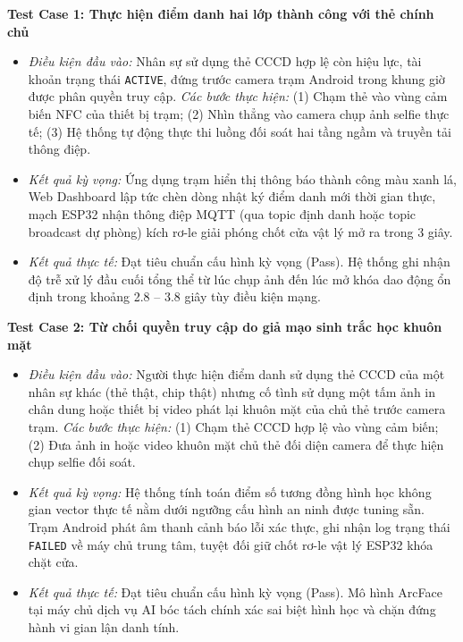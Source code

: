 \documentclass[../DoAn.tex]{subfiles}
\begin{document}
\textbf{Test Case 1: Thực hiện điểm danh hai lớp thành công với thẻ chính chủ}
\begin{itemize}
    \item \textit{Điều kiện đầu vào:} Nhân sự sử dụng thẻ CCCD hợp lệ còn hiệu lực, tài khoản trạng thái \texttt{ACTIVE}, đứng trước camera trạm Android trong khung giờ được phân quyền truy cập.
    \textit{Các bước thực hiện:} (1) Chạm thẻ vào vùng cảm biến NFC của thiết bị trạm; (2) Nhìn thẳng vào camera chụp ảnh selfie thực tế; (3) Hệ thống tự động thực thi luồng đối soát hai tầng ngầm và truyền tải thông điệp.
    \item \textit{Kết quả kỳ vọng:} Ứng dụng trạm hiển thị thông báo thành công màu xanh lá, Web Dashboard lập tức chèn dòng nhật ký điểm danh mới thời gian thực, mạch ESP32 nhận thông điệp MQTT (qua topic định danh hoặc topic broadcast dự phòng) kích rơ-le giải phóng chốt cửa vật lý mở ra trong 3 giây.
    \item \textit{Kết quả thực tế:} Đạt tiêu chuẩn cấu hình kỳ vọng (Pass). Hệ thống ghi nhận độ trễ xử lý đầu cuối tổng thể từ lúc chụp ảnh đến lúc mở khóa dao động ổn định trong khoảng 2.8 -- 3.8 giây tùy điều kiện mạng.
\end{itemize}

\textbf{Test Case 2: Từ chối quyền truy cập do giả mạo sinh trắc học khuôn mặt}
\begin{itemize}
    \item \textit{Điều kiện đầu vào:} Người thực hiện điểm danh sử dụng thẻ CCCD của một nhân sự khác (thẻ thật, chip thật) nhưng cố tình sử dụng một tấm ảnh in chân dung hoặc thiết bị video phát lại khuôn mặt của chủ thẻ trước camera trạm.
    \textit{Các bước thực hiện:} (1) Chạm thẻ CCCD hợp lệ vào vùng cảm biến; (2) Đưa ảnh in hoặc video khuôn mặt chủ thẻ đối diện camera để thực hiện chụp selfie đối soát.
    \item \textit{Kết quả kỳ vọng:} Hệ thống tính toán điểm số tương đồng hình học không gian vector thực tế nằm dưới ngưỡng cấu hình an ninh được tuning sẵn. Trạm Android phát âm thanh cảnh báo lỗi xác thực, ghi nhận log trạng thái \texttt{FAILED} về máy chủ trung tâm, tuyệt đối giữ chốt rơ-le vật lý ESP32 khóa chặt cửa.
    \item \textit{Kết quả thực tế:} Đạt tiêu chuẩn cấu hình kỳ vọng (Pass). Mô hình ArcFace tại máy chủ dịch vụ AI bóc tách chính xác sai biệt hình học và chặn đứng hành vi gian lận danh tính.
\end{itemize}
\end{document}
